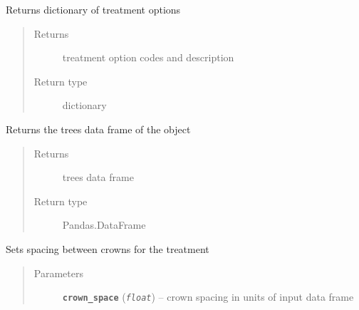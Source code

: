 \documentclass[letterpaper,10pt,english]{sphinxmanual}
\begin{document}
\begin{fulllineitems}

\begin{fulllineitems}
\label{SpaceCrowns:intervene.SpaceCrowns.get_treatment_options}
Returns dictionary of treatment options
\begin{quote}\begin{description}
\item[{Returns}] \leavevmode
treatment option codes and description

\item[{Return type}] \leavevmode
dictionary

\end{description}\end{quote}

\end{fulllineitems}


\begin{fulllineitems}
\label{SpaceCrowns:intervene.SpaceCrowns.get_trees}
Returns the trees data frame of the object
\begin{quote}\begin{description}
\item[{Returns}] \leavevmode
trees data frame

\item[{Return type}] \leavevmode
Pandas.DataFrame

\end{description}\end{quote}

\end{fulllineitems}


\begin{fulllineitems}
\label{SpaceCrowns:intervene.SpaceCrowns.set_crown_space}
Sets spacing between crowns for the treatment
\begin{quote}\begin{description}
\item[{Parameters}] \leavevmode
\textbf{\texttt{crown\_space}} (\emph{\texttt{float}}) -- crown spacing in units of input data frame

\end{description}\end{quote}


\end{fulllineitems}
\end{fulllineitems}
\end{document}
